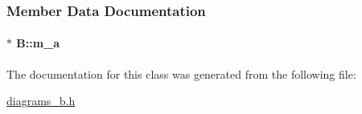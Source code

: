 \subsubsection{Member Data Documentation}
\paragraph[{\texorpdfstring{m\+\_\+a}{m_a}}]{$\ast$ B\+::m\+\_\+a}\hypertarget{class_b_a26c70b64fe7cf17fcced7755ecff7537}{}\label{class_b_a26c70b64fe7cf17fcced7755ecff7537}


The documentation for this class was generated from the following file\+:\begin{DoxyCompactItemize}
\item 
\hyperlink{diagrams__b_8h}{diagrams\+\_\+b.\+h}\end{DoxyCompactItemize}
